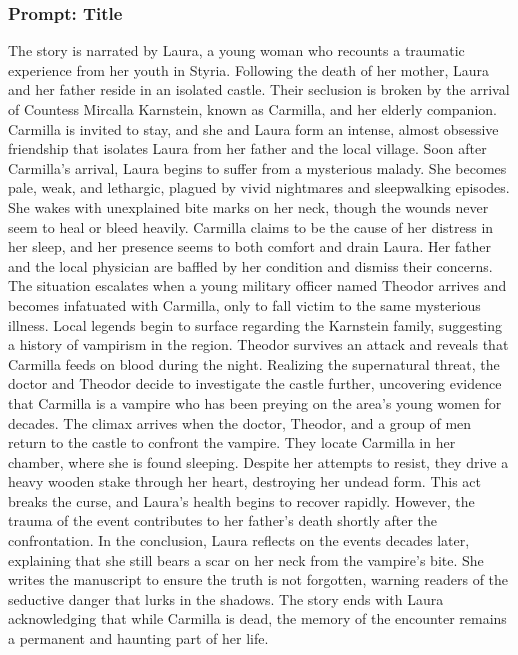 \documentclass{article} %
\begin{document}
\subsubsection{Prompt: Title}

The story is narrated by Laura, a young woman who recounts a traumatic experience from her youth in Styria. Following the death of her mother, Laura and her father reside in an isolated castle. Their seclusion is broken by the arrival of Countess Mircalla Karnstein, known as Carmilla, and her elderly companion. Carmilla is invited to stay, and she and Laura form an intense, almost obsessive friendship that isolates Laura from her father and the local village. Soon after Carmilla’s arrival, Laura begins to suffer from a mysterious malady. She becomes pale, weak, and lethargic, plagued by vivid nightmares and sleepwalking episodes. She wakes with unexplained bite marks on her neck, though the wounds never seem to heal or bleed heavily. Carmilla claims to be the cause of her distress in her sleep, and her presence seems to both comfort and drain Laura. Her father and the local physician are baffled by her condition and dismiss their concerns. \textcolor{skipred}{The situation escalates when a young military officer named Theodor arrives and becomes infatuated with Carmilla, only to fall victim to the same mysterious illness.} Local legends begin to surface regarding the Karnstein family, suggesting a history of vampirism in the region. \textcolor{skipred}{Theodor survives an attack and reveals that Carmilla feeds on blood during the night.} Realizing the supernatural threat, the doctor and Theodor decide to investigate the castle further, uncovering evidence that Carmilla is a vampire who has been preying on the area's young women for decades. The climax arrives when the doctor, Theodor, and a group of men return to the castle to confront the vampire. They locate Carmilla in her chamber, where she is found sleeping. Despite her attempts to resist, they drive a heavy wooden stake through her heart, destroying her undead form. \textcolor{skipred}{This act breaks the curse, and Laura’s health begins to recover rapidly. However, the trauma of the event contributes to her father’s death shortly after the confrontation. In the conclusion, Laura reflects on the events decades later, explaining that she still bears a scar on her neck from the vampire’s bite.} She writes the manuscript to ensure the truth is not forgotten, warning readers of the seductive danger that lurks in the shadows. \textcolor{skipred}{The story ends with Laura acknowledging that while Carmilla is dead, the memory of the encounter remains a permanent and haunting part of her life.}
\end{document}
